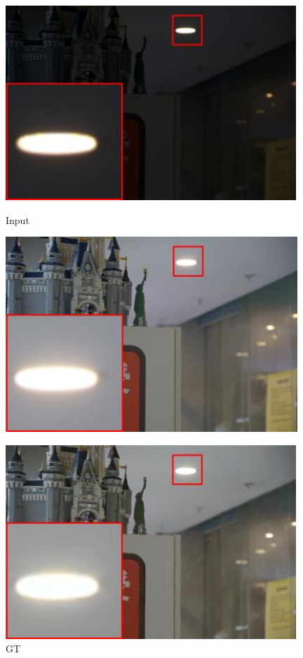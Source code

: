 \documentclass[CJK,aspectratio=169]{beamer}  %
\begin{document}
	\begin{frame}
		
		
		\begin{figure}
			\centering
			\begin{minipage}{.31\textwidth}
				\centering
				\includegraphics[width=.8\linewidth]{picture/LLIE/SCNet/Input}
				\captionsetup{font=scriptsize}
				\label{fig: Input}
				\caption*{Input}
			\end{minipage}
			\begin{minipage}{.31\textwidth}
				\centering
				\includegraphics[width=.8\linewidth]{picture/LLIE/SCNet/GT}
				\captionsetup{font=scriptsize}
				\label{fig: GT}	
				\caption*{GT}
			\end{minipage}
			\begin{minipage}{.31\textwidth}
				\centering
				\includegraphics[width=.8\linewidth]{picture/LLIE/SCNet/Ours}

\end{minipage}
\end{figure}
\end{frame}
\end{document}
